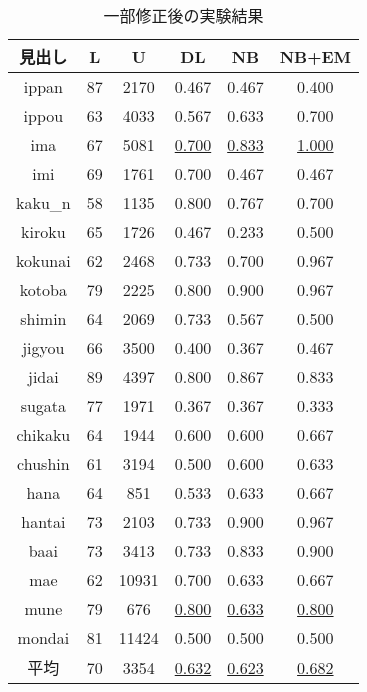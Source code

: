 \begin{table}[htbp]
  \begin{center}
    \leavevmode
    \caption{一部修正後の実験結果}\label{result3}
    \begin{tabular}{|c|c|c|c|c|c|} \hline
見出し    &  L    &  U  &  DL      & NB  & NB+EM \\ \hline
ippan     &  87   & 2170  &  0.467   & 0.467    &  0.400      \\ 
ippou     &  63   & 4033  &  0.567   & 0.633    &  0.700     \\ 
ima       &  67   & 5081  &  \underline{0.700}    & \underline{0.833}    &  \underline{1.000}     \\ 
imi       &  69   & 1761  &  0.700   & 0.467    &  0.467     \\ 
kaku\_n   &  58   & 1135  &  0.800   & 0.767    &  0.700     \\ 
kiroku    &  65   & 1726  &  0.467   & 0.233    &  0.500     \\ 
kokunai   &  62   & 2468  &  0.733   & 0.700    &  0.967     \\ 
kotoba    &  79   & 2225  &  0.800   & 0.900    &  0.967     \\ 
shimin    &  64   & 2069  &  0.733   & 0.567    &  0.500     \\ 
jigyou    &  66   & 3500  &  0.400   & 0.367    &  0.467     \\ 
jidai     &  89   & 4397  &  0.800   & 0.867    &  0.833     \\ 
sugata    &  77   & 1971  &  0.367   & 0.367    &  0.333     \\ 
chikaku   &  64   & 1944  &  0.600   & 0.600    &  0.667     \\ 
chushin   &  61   & 3194  &  0.500   & 0.600    &  0.633     \\ 
hana      &  64   &  851  &  0.533   & 0.633    &  0.667     \\ 
hantai    &  73   & 2103  &  0.733   & 0.900    &  0.967     \\ 
baai      &  73   & 3413  &  0.733   & 0.833    &  0.900     \\ 
mae       &  62   & 10931 &  0.700   & 0.633    &  0.667     \\ 
mune      &  79   &   676 &  \underline{0.800}    & \underline{0.633}    &  \underline{0.800}     \\ 
mondai    &  81   & 11424 &  0.500   & 0.500    &  0.500     \\  \hline
平均      &  70   &  3354  &  \underline{0.632}  & \underline{0.623}    &  \underline{0.682}     \\ \hline
    \end{tabular}
  \end{center}
\end{table}


